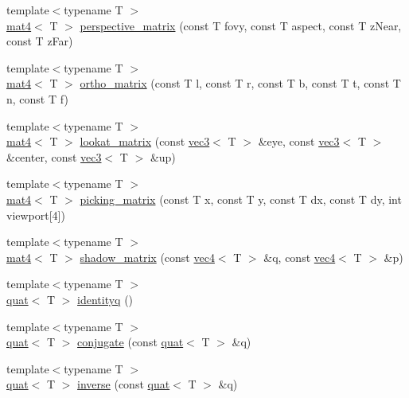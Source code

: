 \begin{DoxyCompactItemize}
\item 
{\footnotesize template$<$typename T $>$ }\\\hyperlink{structvmath_1_1mat4}{mat4}$<$ T $>$ \hyperlink{namespacevmath_a658569e855352a50240a2a91431bde2c}{perspective\-\_\-matrix} (const T fovy, const T aspect, const T z\-Near, const T z\-Far)
\item 
{\footnotesize template$<$typename T $>$ }\\\hyperlink{structvmath_1_1mat4}{mat4}$<$ T $>$ \hyperlink{namespacevmath_a19c105d09eb64fc596b17273027d4792}{ortho\-\_\-matrix} (const T l, const T r, const T b, const T t, const T n, const T f)
\item 
{\footnotesize template$<$typename T $>$ }\\\hyperlink{structvmath_1_1mat4}{mat4}$<$ T $>$ \hyperlink{namespacevmath_a9b5467cc387e1a05f008158b6188d509}{lookat\-\_\-matrix} (const \hyperlink{structvmath_1_1vec3}{vec3}$<$ T $>$ \&eye, const \hyperlink{structvmath_1_1vec3}{vec3}$<$ T $>$ \&center, const \hyperlink{structvmath_1_1vec3}{vec3}$<$ T $>$ \&up)
\item 
{\footnotesize template$<$typename T $>$ }\\\hyperlink{structvmath_1_1mat4}{mat4}$<$ T $>$ \hyperlink{namespacevmath_a7b22d17caeb4f6118aae0fc3d736fa47}{picking\-\_\-matrix} (const T x, const T y, const T dx, const T dy, int viewport\mbox{[}4\mbox{]})
\item 
{\footnotesize template$<$typename T $>$ }\\\hyperlink{structvmath_1_1mat4}{mat4}$<$ T $>$ \hyperlink{namespacevmath_a8e2c7da159d70ab6ce1f604a2a157d2a}{shadow\-\_\-matrix} (const \hyperlink{structvmath_1_1vec4}{vec4}$<$ T $>$ \&q, const \hyperlink{structvmath_1_1vec4}{vec4}$<$ T $>$ \&p)
\item 
{\footnotesize template$<$typename T $>$ }\\\hyperlink{structvmath_1_1quat}{quat}$<$ T $>$ \hyperlink{namespacevmath_af191b4dd1ab40a6462062ead5495f27e}{identityq} ()
\item 
{\footnotesize template$<$typename T $>$ }\\\hyperlink{structvmath_1_1quat}{quat}$<$ T $>$ \hyperlink{namespacevmath_a04eba599519fec3c01318634f09cea03}{conjugate} (const \hyperlink{structvmath_1_1quat}{quat}$<$ T $>$ \&q)
\item 
{\footnotesize template$<$typename T $>$ }\\\hyperlink{structvmath_1_1quat}{quat}$<$ T $>$ \hyperlink{namespacevmath_a0a0c570117116f82a7d3394ffda48a17}{inverse} (const \hyperlink{structvmath_1_1quat}{quat}$<$ T $>$ \&q)

\end{DoxyCompactItemize}

